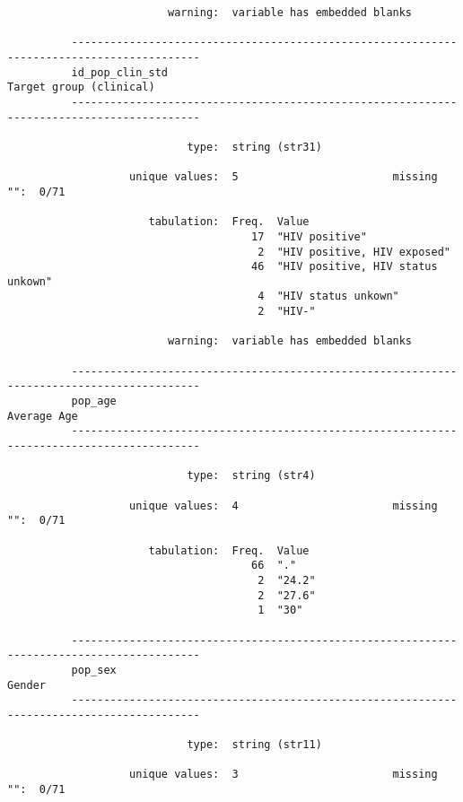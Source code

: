 \documentclass{article}
\begin{document}
\begin{verbatim}
                         warning:  variable has embedded blanks
          
          ------------------------------------------------------------------------------------------
          id_pop_clin_std                                                    Target group (clinical)
          ------------------------------------------------------------------------------------------
          
                            type:  string (str31)
          
                   unique values:  5                        missing "":  0/71
          
                      tabulation:  Freq.  Value
                                      17  "HIV positive"
                                       2  "HIV positive, HIV exposed"
                                      46  "HIV positive, HIV status unkown"
                                       4  "HIV status unkown"
                                       2  "HIV-"
          
                         warning:  variable has embedded blanks
          
          ------------------------------------------------------------------------------------------
          pop_age                                                                        Average Age
          ------------------------------------------------------------------------------------------
          
                            type:  string (str4)
          
                   unique values:  4                        missing "":  0/71
          
                      tabulation:  Freq.  Value
                                      66  "."
                                       2  "24.2"
                                       2  "27.6"
                                       1  "30"
          
          ------------------------------------------------------------------------------------------
          pop_sex                                                                             Gender
          ------------------------------------------------------------------------------------------
          
                            type:  string (str11)
          
                   unique values:  3                        missing "":  0/71
          

\end{verbatim}
\end{document}
